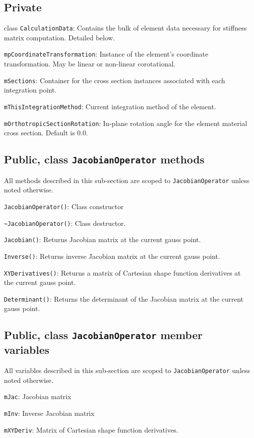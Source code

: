 \subsection{Private}
class \texttt{CalculationData}: Contains the bulk of element data necessary for stiffness matrix computation. Detailed below.

\texttt{mpCoordinateTransformation}: Instance of the element's coordinate transformation. May be linear or non-linear corotational.

\texttt{mSections}: Container for the cross section instances associated with each integration point.

\texttt{mThisIntegrationMethod}: Current integration method of the element.

\texttt{mOrthotropicSectionRotation}: In-plane rotation angle for the element material cross section. Default is 0.0.

\subsection{Public, class \texttt{JacobianOperator} methods}
All methods described in this sub-section are scoped to \texttt{JacobianOperator} unless noted otherwise.

\texttt{JacobianOperator()}: Class constructor

\texttt{\textasciitilde JacobianOperator()}: Class destructor.

\texttt{Jacobian()}: Returns Jacobian matrix at the current gauss point.

\texttt{Inverse()}: Returns inverse Jacobian matrix at the current gauss point.

\texttt{XYDerivatives()}: Returns a matrix of Cartesian shape function derivatives at the current gauss point.

\texttt{Determinant()}: Returns the determinant of the Jacobian matrix at the current gauss point.

\subsection{Public, class \texttt{JacobianOperator} member variables}
All variables described in this sub-section are scoped to \texttt{JacobianOperator} unless noted otherwise.

\texttt{mJac}: Jacobian matrix

\texttt{mInv}: Inverse Jacobian matrix

\texttt{mXYDeriv}: Matrix of Cartesian shape function derivatives.

